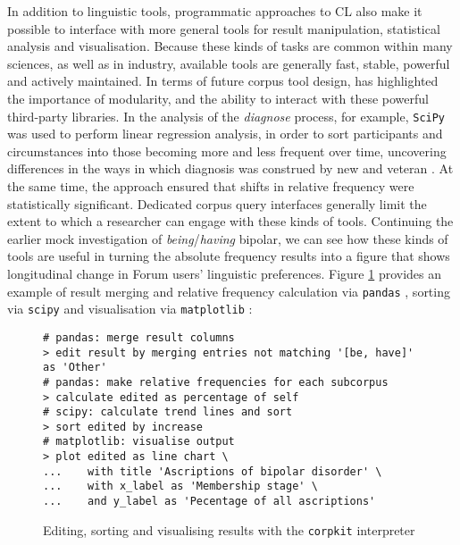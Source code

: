 In addition to linguistic tools, programmatic approaches to \gls{CL} also make it possible to interface with more general tools for result manipulation, statistical analysis and visualisation. Because these kinds of tasks are common within many sciences, as well as in industry, available tools are generally fast, stable, powerful and actively maintained. In terms of future \gls{corpus} tool design, \textcite{anthony_critical_2013} has highlighted the importance of modularity, and the ability to interact with these powerful third\hyp{}party libraries. In the analysis of the \emph{diagnose} process, for example, \texttt{SciPy} \cite{scipy2001} was used to perform linear regression analysis, in order to sort participants and circumstances into those becoming more and less frequent over time, uncovering differences in the ways in which diagnosis was construed by new and veteran . At the same time, the approach ensured that shifts in relative frequency were statistically significant. Dedicated \gls{corpus} query interfaces generally limit the extent to which a researcher can engage with these kinds of tools. Continuing the earlier mock investigation of \emph{being}\slash \emph{having} \gls{bipolar}, we can see how these kinds of tools are useful in turning the absolute frequency results into a figure that shows longitudinal change in Forum users' linguistic preferences. Figure \ref{fig:edit-calc-vis} provides an example of result merging and relative frequency calculation via \texttt{pandas} \cite{mckinney_pandas_2010}, sorting via \texttt{scipy} \cite{scipy2001} and visualisation via \texttt{matplotlib} \cite{matplotlib_2007}:

\begin{figure}[htb]
\begin{verbatim}
# pandas: merge result columns
> edit result by merging entries not matching '[be, have]' as 'Other'
# pandas: make relative frequencies for each subcorpus
> calculate edited as percentage of self
# scipy: calculate trend lines and sort
> sort edited by increase
# matplotlib: visualise output
> plot edited as line chart \
...    with title 'Ascriptions of bipolar disorder' \
...    with x_label as 'Membership stage' \
...    and y_label as 'Pecentage of all ascriptions'
\end{verbatim}
\caption[Editing, sorting and visualising results]{Editing, sorting and visualising results with the \texttt{corpkit} interpreter}
\label{fig:edit-calc-vis}
\end{figure}
%

